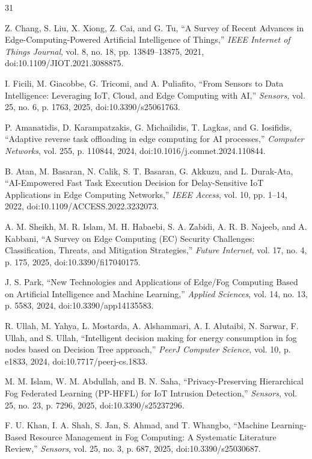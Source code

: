 \documentclass[conference]{IEEEtran}
\begin{document}
\begin{thebibliography}{31}

 Z. Chang, S. Liu, X. Xiong, Z. Cai, and G. Tu, ``A Survey of Recent Advances in Edge-Computing-Powered Artificial Intelligence of Things,'' \emph{IEEE Internet of Things Journal}, vol. 8, no. 18, pp. 13849--13875, 2021, doi:10.1109/JIOT.2021.3088875.

 I. Ficili, M. Giacobbe, G. Tricomi, and A. Puliafito, ``From Sensors to Data Intelligence: Leveraging IoT, Cloud, and Edge Computing with AI,'' \emph{Sensors}, vol. 25, no. 6, p. 1763, 2025, doi:10.3390/s25061763.

 P. Amanatidis, D. Karampatzakis, G. Michailidis, T. Lagkas, and G. Iosifidis, ``Adaptive reverse task offloading in edge computing for AI processes,'' \emph{Computer Networks}, vol. 255, p. 110844, 2024, doi:10.1016/j.comnet.2024.110844.

 B. Atan, M. Basaran, N. Calik, S. T. Basaran, G. Akkuzu, and L. Durak-Ata, ``AI-Empowered Fast Task Execution Decision for Delay-Sensitive IoT Applications in Edge Computing Networks,'' \emph{IEEE Access}, vol. 10, pp. 1--14, 2022, doi:10.1109/ACCESS.2022.3232073.

 A. M. Sheikh, M. R. Islam, M. H. Habaebi, S. A. Zabidi, A. R. B. Najeeb, and A. Kabbani, ``A Survey on Edge Computing (EC) Security Challenges: Classification, Threats, and Mitigation Strategies,'' \emph{Future Internet}, vol. 17, no. 4, p. 175, 2025, doi:10.3390/fi17040175.

 J. S. Park, ``New Technologies and Applications of Edge/Fog Computing Based on Artificial Intelligence and Machine Learning,'' \emph{Applied Sciences}, vol. 14, no. 13, p. 5583, 2024, doi:10.3390/app14135583.

 R. Ullah, M. Yahya, L. Mostarda, A. Alshammari, A. I. Alutaibi, N. Sarwar, F. Ullah, and S. Ullah, ``Intelligent decision making for energy consumption in fog nodes based on Decision Tree approach,'' \emph{PeerJ Computer Science}, vol. 10, p. e1833, 2024, doi:10.7717/peerj-cs.1833.

 M. M. Islam, W. M. Abdullah, and B. N. Saha, ``Privacy-Preserving Hierarchical Fog Federated Learning (PP-HFFL) for IoT Intrusion Detection,'' \emph{Sensors}, vol. 25, no. 23, p. 7296, 2025, doi:10.3390/s25237296.

 F. U. Khan, I. A. Shah, S. Jan, S. Ahmad, and T. Whangbo, ``Machine Learning-Based Resource Management in Fog Computing: A Systematic Literature Review,'' \emph{Sensors}, vol. 25, no. 3, p. 687, 2025, doi:10.3390/s25030687.


\end{thebibliography}
\end{document}
